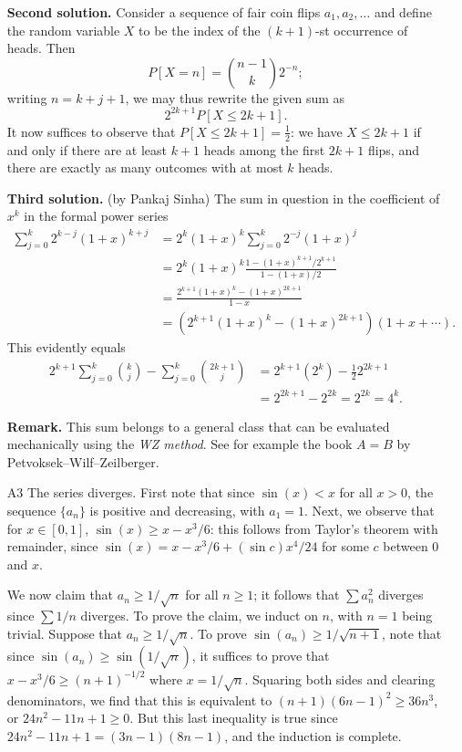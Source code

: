 \documentclass[amssymb,twocolumn,pra,10pt,aps]{revtex4-1}
\begin{document}
\begin{itemize}
\noindent
\textbf{Second solution.}
Consider a sequence of fair coin flips $a_1, a_2, \dots$ and define the random variable $X$ to be the index of the $(k+1)$-st occurrence of heads.
Then
\[
P[X = n] = \binom{n-1}{k} 2^{-n};
\]
writing $n = k+j+1$, we may thus rewrite the given sum as
\[
2^{2k+1} P[X \leq 2k+1].
\]
It now suffices to observe that $P[X \leq 2k+1] = \frac{1}{2}$:
we have $X \leq 2k+1$ if and only if there are at least $k+1$ heads among the first $2k+1$ flips,
and there are exactly as many outcomes with at most $k$ heads.

\noindent
\textbf{Third solution.}
(by Pankaj Sinha)
The sum in question in the coefficient of $x^k$ in the formal power series
\begin{align*}
\sum_{j=0}^k 2^{k-j} (1+x)^{k+j} &= 2^k (1+x)^k \sum_{j=0}^k 2^{-j} (1+x)^j \\
&= 2^k (1+x)^k \frac{1 - (1+x)^{k+1}/2^{k+1}}{1 - (1+x)/2} \\
&= \frac{2^{k+1}(1+x)^k - (1+x)^{2k+1}}{1-x} \\
&= (2^{k+1}(1+x)^k - (1+x)^{2k+1})(1+x+\cdots).
\end{align*}
This evidently equals
\begin{align*}
2^{k+1} \sum_{j=0}^k \binom{k}{j} - \sum_{j=0}^k \binom{2k+1}{j} &= 2^{k+1} (2^k) - \frac{1}{2} 2^{2k+1}  \\
&= 2^{2k+1} - 2^{2k} = 2^{2k} = 4^k.
\end{align*}

\noindent
\textbf{Remark.}
This sum belongs to a general class that can be evaluated mechanically using the \emph{WZ method}. See for example the book \textit{$A=B$}
by Petvoksek--Wilf--Zeilberger.

\item[A3]
The series diverges. First note that since $\sin (x)<x$ for all $x>0$, the sequence $\{a_n\}$ is positive and decreasing, with $a_1=1$. Next, we observe that for $x \in [0,1]$, $\sin(x) \geq x-x^3/6$: this follows from Taylor's theorem with remainder, since $\sin(x) = x- x^3/6+(\sin c)x^4/24$ for some $c$ between $0$ and $x$.

We now claim that $a_n \geq 1/\sqrt{n}$ for all $n \geq 1$; it follows that $\sum a_n^2$ diverges since $\sum 1/n$ diverges. To prove the claim, we induct on $n$, with $n=1$ being trivial. Suppose that $a_n \geq 1/\sqrt{n}$. To prove $\sin(a_n) \geq 1/\sqrt{n+1}$, note that since $\sin(a_n) \geq \sin(1/\sqrt{n})$, it suffices to prove that $x-x^3/6 \geq (n+1)^{-1/2}$ where $x=1/\sqrt{n}$. Squaring both sides and clearing denominators, we find that this is equivalent to $(n+1)(6n-1)^2 \geq 36n^3$, or $24n^2-11n+1 \geq 0$. But this last inequality is true since $24n^2-11n+1 = (3n-1)(8n-1)$, and the induction is complete.


\end{itemize}
\end{document}
